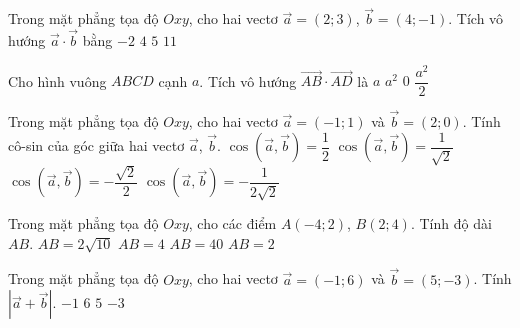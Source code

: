 \begin{ex}%
	Trong mặt phẳng tọa độ $Oxy$, cho hai vectơ $\overrightarrow{a} = (2;3)$, $\overrightarrow{b} = (4;-1)$. Tích vô hướng $\overrightarrow{a}\cdot\overrightarrow{b}$ bằng
	\choice
	{$-2$}
	{$4$}
	{\True $5$}
	{$11$}
\end{ex}

\begin{ex}%
	Cho hình vuông $ABCD$ cạnh $a$. Tích vô hướng $\overrightarrow{A B} \cdot \overrightarrow{A D}$ là
	\choice
	{$a$}
	{$a^{2}$}
	{\True $0$}
	{$\dfrac{a^{2}}{2}$}
\end{ex}

\begin{ex}%
	Trong mặt phẳng tọa độ $Oxy$, cho hai vectơ $\overrightarrow{a} =(-1;1)$ và $\overrightarrow{b} = (2;0)$. Tính cô-sin của góc giữa hai vectơ $\overrightarrow{a}$, $\overrightarrow{b}$.
	\choice
	{$\cos \left(\overrightarrow{a}, \overrightarrow{b}\right) =\dfrac{ 1}{2 }$}
	{$\cos \left(\overrightarrow{a}, \overrightarrow{b}\right) =\dfrac{1 }{ \sqrt{2}}$}
	{\True $\cos \left(\overrightarrow{a}, \overrightarrow{b}\right) =-\dfrac{\sqrt{2}}{2}$}
	{$\cos \left(\overrightarrow{a}, \overrightarrow{b}\right) =-\dfrac{1}{2\sqrt{2}}$}
\end{ex}

\begin{ex}%
	Trong mặt phẳng tọa độ $Oxy$, cho các điểm $A(-4;2)$, $B(2;4)$. Tính độ dài $AB$.
	\choice        
	{\True $AB=2\sqrt{10}$}
	{$AB=4$}
	{$AB=40$}
	{$AB=2$}
\end{ex}

\begin{ex}%
	Trong mặt phẳng tọa độ $Oxy$, cho hai vectơ $\overrightarrow{a}= (-1;6)$ và $\overrightarrow{b} = (5;-3)$. Tính $\left| \overrightarrow{a}+\overrightarrow{b} \right|$.
	\choice
	{$-1$}
	{$6$}
	{\True $5$}
	{$-3$}
\end{ex}

